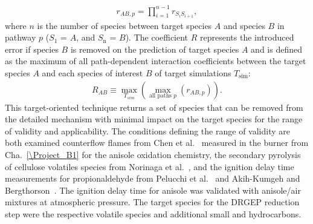 \begin{refsection}
\begin{align}
r_{AB,p} = \prod_{i=1}^{n-1} r_{S_iS_{i+1}},
\end{align}
where $n$ is the number of species between target species $A$ and species $B$ in pathway $p$ ($S_\mathrm{1}$ = $A$, and $S_\mathrm{n}$ = $B$). The coefficient $R$ represents the introduced error if species $B$ is removed on the prediction of target species $A$ and is defined as the maximum of all path-dependent interaction coefficients between the target species $A$ and each species of interest $B$ of target simulations $T_\mathrm{sim}$:
\begin{align}
R_{AB} \equiv \mathop{max}_{T_{sim}} (\mathop{max}_{\text{all paths } p} (r_{AB,p})).
\end{align}
This target-oriented technique returns a set of species that can be removed from the detailed mechanism with minimal impact on the target species for the range of validity and applicability. The conditions defining the range of validity are both examined counterflow flames from Chen et al.~\cite{Chen2022} measured in the burner from Cha.~\ref{\Project_B1} for the anisole oxidation chemistry, the secondary pyrolysis of cellulose volatiles species from Norinaga et al.~\cite{Norinaga2013}, and the ignition delay time measurements for propionaldehyde from Pelucchi et al.~\cite{Pelucchi2015} and Akih-Kumgeh and Bergthorson~\cite{AkihKumgehBergthorson2011}. The ignition delay time for anisole was validated with anisole/air mixtures at atmospheric pressure. The target species for the DRGEP reduction step were the respective volatile species and additional small  and  hydrocarbons.



\end{refsection}
